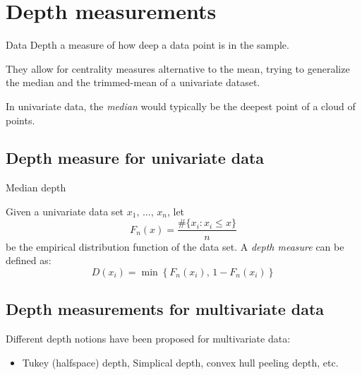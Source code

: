 \pagebreak
\section{Depth measurements}

\begin{definition}{Data Depth}{}
    a measure of how deep a data point is in the sample.

    They allow for centrality measures alternative to the mean, trying
    to generalize the median and the trimmed-mean
    of a univariate dataset.

    \tcblower

    \begin{note}
        In univariate data, the \emph{median} would typically be the deepest point
        of a cloud of points.
    \end{note}
\end{definition}

\subsection{Depth measure for univariate data}

\begin{definition}{Median depth}{}

Given a univariate data set $x_1,\, \dots,\, x_n$, let
\begin{equation*}
    F_n(x) = \frac{\#\{x_i: x_i \leq x\}}{n} \tag{Empirical distribution function}
\end{equation*}
be the empirical distribution function of the data set. A \emph{depth measure} can
be defined as:
\begin{equation*}
    D(x_i) = \min\left\{ F_n(x_i),\, 1 - F_n(x_i) \right\} \tag{depth measure}
\end{equation*}
\end{definition}

\subsection{Depth measurements for multivariate data}

Different depth notions have been proposed for multivariate data:
\begin{itemize}
    \item Tukey (halfspace) depth, Simplical depth, convex hull peeling depth, etc.
\end{itemize}

